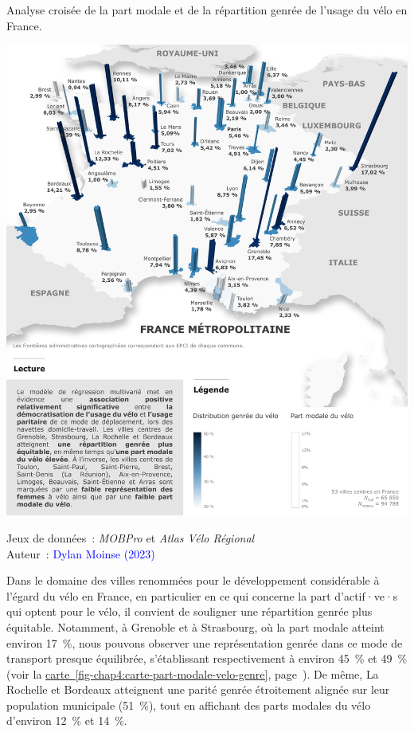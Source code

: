\begin{refsegment}
    \begin{carte}[h!]\vspace*{4pt}
        \caption{Analyse croisée de la part modale et de la répartition genrée de l'usage du vélo en France.}
        \label{fig-chap4:carte-part-modale-velo-genre}
        \centerline{\includegraphics[width=1\columnwidth]{src/Figures/Chap-4/FR_Democratisation_velo_genre_OLS.jpg}}
        \vspace{5pt}
        \begin{flushright}\scriptsize{
        Jeux de données~: \textsl{MOBPro} \textcolor{blue}{\autocite{insee_documentation_2023}} et \textsl{Atlas Vélo Régional} \textcolor{blue}{\autocite{velo__territoires_atlas_2023}}
        \\
        Auteur~: \textcolor{blue}{Dylan Moinse (2023)}
        }\end{flushright}
    \end{carte}

Dans le domaine des villes renommées pour le développement considérable à l'égard du vélo en France, en particulier en ce qui concerne la part d'actif·ve·s qui optent pour le vélo, il convient de souligner une répartition genrée plus équitable. Notamment, à Grenoble et à Strasbourg, où la part modale atteint environ 17~\%, nous pouvons observer une représentation genrée dans ce mode de transport presque équilibrée, s'établissant respectivement à environ 45~\% et 49~\% (voir la \hyperref[fig-chap4:carte-part-modale-velo-genre]{carte~\ref{fig-chap4:carte-part-modale-velo-genre}}, page~\pageref{fig-chap4:carte-part-modale-velo-genre}). De même, La Rochelle et Bordeaux atteignent une parité genrée étroitement alignée sur leur population municipale (51~\%), tout en affichant des parts modales du vélo d'environ 12~\% et 14~\%.%


\end{refsegment}
